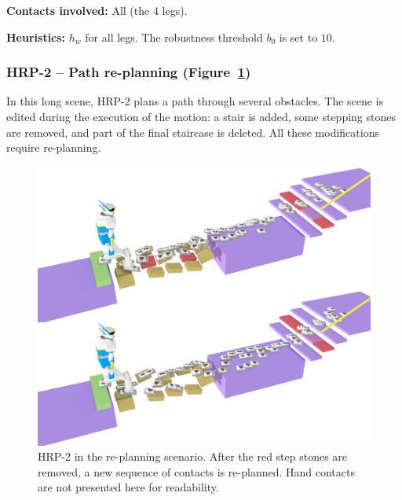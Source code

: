 \documentclass[journal]{IEEEtran}
\newcommand{\gls}[1]{\textit{#1}}
\begin{document}
\noindent\textbf{Contacts involved:} All (the 4 legs).

\noindent\textbf{Heuristics:} $h_w$ for all legs. The robustness threshold $b_0$ is set to $10$.


\subsubsection{HRP-2 -- Path re-planning (Figure~\ref{fig:re-planning})}
In this long scene, HRP-2 plans a path through several obstacles. The scene is edited during the execution of the motion: a stair is added,
some stepping stones are removed, and part of the final staircase is deleted. All these modifications require re-planning.


\begin{figure}
  \centering
  \includegraphics[width=0.7\linewidth]{figures/replanning}
  \caption{
           HRP-2 in the re-planning scenario. After the red step stones are removed, a new sequence of contacts is re-planned. Hand contacts
           are not presented here for readability.}
		   \label{fig:re-planning}
\end{figure}
\end{document}
